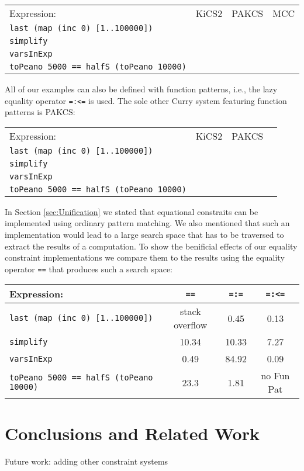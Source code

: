 \documentclass{llncs}
\newcommand{\code}[1]{\mbox{\small\texttt{#1}}}
\begin{document}
\begin{tabular}{|l|c|c|c|}
\hline
Expression: & KiCS2 & PAKCS & MCC \\
\code{last (map (inc 0) [1..100000])} & &  & \\
\code{simplify}                       &&&\\
\code{varsInExp} & &  &\\
\code{toPeano 5000 == halfS (toPeano 10000)} & &  &\\
\hline
\end{tabular}

All of our examples can also be defined with function patterns, i.e.,
the lazy equality operator \code{=:<=} is used. The sole other
Curry system featuring function patterns is PAKCS:

\begin{tabular}{|l|c|c|c|}
\hline
Expression: & KiCS2 & PAKCS \\
\code{last (map (inc 0) [1..100000])} & &  & \\
\code{simplify}                       &&&\\
\code{varsInExp} & &  &\\
\code{toPeano 5000 == halfS (toPeano 10000)} & &  &\\
\hline
\end{tabular}

In Section \ref{sec:Unification} we stated that equational
constraits can be implemented using ordinary pattern matching.
We also mentioned that such an implementation would lead to
a large search space that has to be traversed to extract
the results of a computation. To show the benificial effects
of our equality constraint implementations we compare them to
the results using the equality operator \code{==} that
produces such a search space:

\begin{tabular}{|l|c|c|c|}
\hline
Expression: &\code{==} & \code{=:=} & \code{=:<=}\\
\hline 
\code{last (map (inc 0) [1..100000])} & stack overflow & 0.45 & 0.13\\
\code{simplify}                       &10.34&10.33&7.27\\
\code{varsInExp} & 0.49& 84.92 & 0.09\\
\code{toPeano 5000 == halfS (toPeano 10000)} & 23.3 & 1.81 & no Fun Pat\\
\hline
\end{tabular}

 



\section{Conclusions and Related Work}
\label{sec:Conclusions}

Future work: adding other constraint systems




\end{document}
